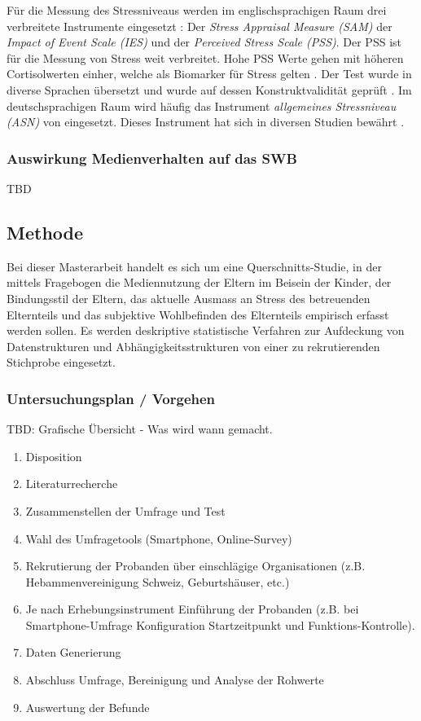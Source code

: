 Für die Messung des Stressniveaus werden im englischsprachigen Raum drei verbreitete Instrumente eingesetzt \cite{Andreou2011}: Der \textit{Stress Appraisal Measure (SAM)} der \textit{Impact of Event Scale (IES)} und der \textit{Perceived Stress Scale (PSS)}. Der PSS ist für die Messung von Stress weit verbreitet. Hohe PSS Werte gehen mit höheren Cortisolwerten einher, welche als Biomarker für Stress gelten \cite{Malarkey1995, VanEck2005}. Der Test wurde in diverse Sprachen übersetzt und wurde auf dessen Konstruktvalidität geprüft \cite{Cohen1988, Byrne2005}. Im deutschsprachigen Raum wird häufig das Instrument \textit{allgemeines Stressniveau (ASN)} von  eingesetzt. Dieses Instrument hat sich in diversen Studien bewährt \cite{Cina2009}.
 
\subsubsection{Auswirkung Medienverhalten auf das SWB}
TBD

\subsection{Methode}
Bei dieser Masterarbeit handelt es sich um eine Querschnitts-Studie, in der mittels Fragebogen die Mediennutzung der Eltern im Beisein der Kinder, der Bindungsstil der Eltern, das aktuelle Ausmass an Stress des betreuenden Elternteils und das subjektive Wohlbefinden des Elternteils empirisch erfasst werden sollen. 
Es werden deskriptive statistische Verfahren zur Aufdeckung von Datenstrukturen und Abhängigkeitsstrukturen von einer zu rekrutierenden Stichprobe eingesetzt.
\subsubsection{Untersuchungsplan / Vorgehen}
TBD: Grafische Übersicht - Was wird wann gemacht.
\begin{enumerate}
    \item Disposition
    \item Literaturrecherche
    \item Zusammenstellen der Umfrage und Test
    \item Wahl des Umfragetools (Smartphone, Online-Survey)
    \item Rekrutierung der Probanden über einschlägige Organisationen (z.B. Hebammenvereinigung Schweiz, Geburtshäuser, etc.)
    \item Je nach Erhebungsinstrument Einführung der Probanden (z.B. bei Smartphone-Umfrage Konfiguration Startzeitpunkt und Funktions-Kontrolle).
    \item Daten Generierung
    \item Abschluss Umfrage, Bereinigung und Analyse der Rohwerte
    \item Auswertung der Befunde
\end{enumerate}
